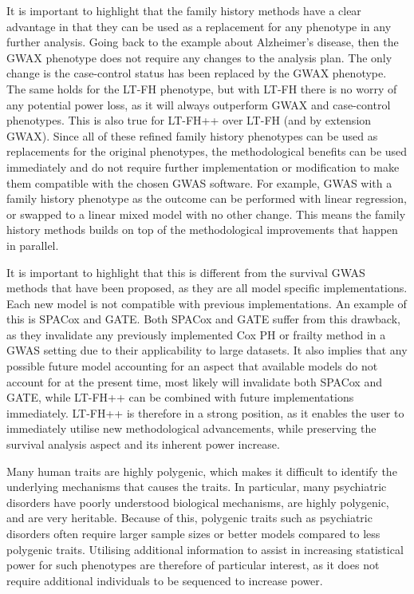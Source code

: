 It is important to highlight that the family history methods have a clear advantage in that they can be used as a replacement for any phenotype in any further analysis. Going back to the example about Alzheimer's disease, then the GWAX phenotype does not require any changes to the analysis plan. The only change is the case-control status has been replaced by the GWAX phenotype. The same holds for the LT-FH phenotype, but with LT-FH there is no worry of any potential power loss, as it will always outperform GWAX and case-control phenotypes. This is also true for LT-FH++ over LT-FH (and by extension GWAX). Since all of these refined family history phenotypes can be used as replacements for the original phenotypes, the methodological benefits can be used immediately and do not require further implementation or modification to make them compatible with the chosen GWAS software. For example, GWAS with a family history phenotype as the outcome can be performed with linear regression, or swapped to a linear mixed model with no other change. This means the family history methods builds on top of the methodological improvements that happen in parallel.

It is important to highlight that this is different from the survival GWAS methods that have been proposed, as they are all model specific implementations. Each new model is not compatible with previous implementations. An example of this is SPACox and GATE. Both SPACox and GATE suffer from this drawback, as they invalidate any previously implemented Cox PH or frailty method in a GWAS setting due to their applicability to large datasets. It also implies that any possible future model accounting for an aspect that available models do not account for at the present time, most likely will invalidate both SPACox and GATE, while LT-FH++ can be combined with future implementations immediately. LT-FH++ is therefore in a strong position, as it enables the user to immediately utilise new methodological advancements, while preserving the survival analysis aspect and its inherent power increase.    

Many human traits are highly polygenic, which makes it difficult to identify the underlying mechanisms that causes the traits\cite{song2021selection}. In particular, many psychiatric disorders have poorly understood biological mechanisms, are highly polygenic, and are very heritable\cite{pardinas2018common,esteller2020genomic}. Because of this, polygenic traits such as psychiatric disorders often require larger sample sizes or better models compared to less polygenic traits\cite{han2008genome,bergen2012genome,badano2002beyond}. Utilising additional information to assist in increasing statistical power for such phenotypes are therefore of particular interest, as it does not require additional individuals to be sequenced to increase power.



